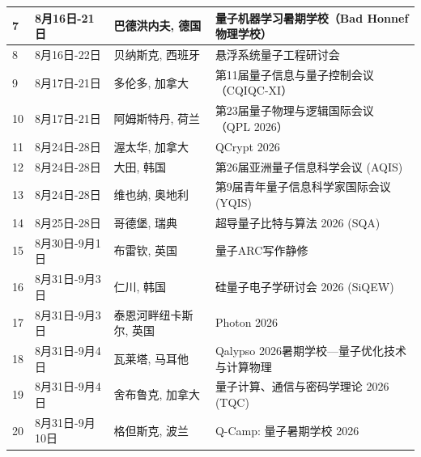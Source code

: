 \documentclass[12pt,a4paper]{ctexart}
\begin{document}
{\begin{longtable}{C{0.8cm}L{2.5cm}L{3cm}L{7cm}}
        7 & 8月16日-21日 & 巴德洪内夫, 德国 & 量子机器学习暑期学校（Bad Honnef物理学校） \\
        \midrule[0.05pt]
        
        8 & 8月16日-22日 & 贝纳斯克, 西班牙 & 悬浮系统量子工程研讨会 \\
        \midrule[0.05pt]
        
        9 & 8月17日-21日 & 多伦多, 加拿大 & 第11届量子信息与量子控制会议（CQIQC-XI） \\
        \midrule[0.05pt]
        
        10 & 8月17日-21日 & 阿姆斯特丹, 荷兰 & 第23届量子物理与逻辑国际会议（QPL 2026） \\
        \midrule[0.05pt]
        
        11 & 8月24日-28日 & 渥太华, 加拿大 & QCrypt 2026 \\
        \midrule[0.05pt]
        
        12 & 8月24日-28日 & 大田, 韩国 & 第26届亚洲量子信息科学会议 (AQIS) \\
        \midrule[0.05pt]
        
        13 & 8月24日-28日 & 维也纳, 奥地利 & 第9届青年量子信息科学家国际会议 (YQIS) \\
        \midrule[0.05pt]
        
        14 & 8月25日-28日 & 哥德堡, 瑞典 & 超导量子比特与算法 2026 (SQA) \\
        \midrule[0.05pt]
        
        15 & 8月30日-9月1日 & 布雷钦, 英国 & 量子ARC写作静修 \\
        \midrule[0.05pt]
        
        16 & 8月31日-9月3日 & 仁川, 韩国 & 硅量子电子学研讨会 2026 (SiQEW) \\
        \midrule[0.05pt]
        
        17 & 8月31日-9月3日 & 泰恩河畔纽卡斯尔, 英国 & Photon 2026 \\
        \midrule[0.05pt]
        
        18 & 8月31日-9月4日 & 瓦莱塔, 马耳他 & Qalypso 2026暑期学校—量子优化技术与计算物理 \\
        \midrule[0.05pt]
        
        19 & 8月31日-9月4日 & 舍布鲁克, 加拿大 & 量子计算、通信与密码学理论 2026 (TQC) \\
        \midrule[0.05pt]
        
        20 & 8月31日-9月10日 & 格但斯克, 波兰 & Q-Camp: 量子暑期学校 2026 \\
        \midrule[0.05pt]
        
    \end{longtable}
}
\end{document}
